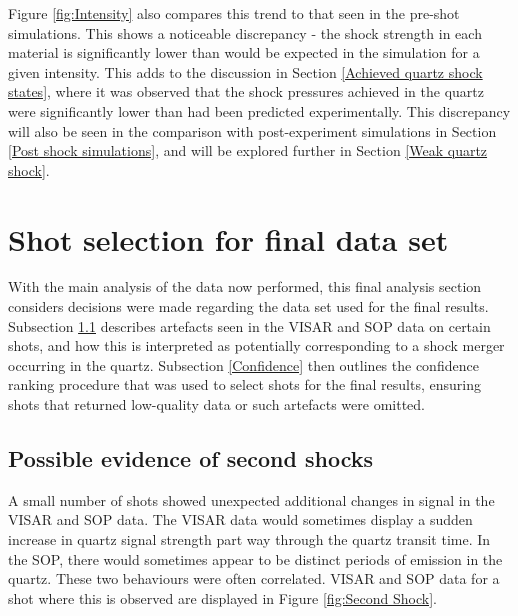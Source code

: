 Figure \ref{fig:Intensity} also compares this trend to that seen in the pre-shot simulations. This shows a noticeable discrepancy - the shock strength in each material is significantly lower than would be expected in the simulation for a given intensity. This adds to the discussion in Section \ref{Achieved quartz shock states}, where it was observed that the shock pressures achieved in the quartz were significantly lower than had been predicted experimentally. This discrepancy will also be seen in the comparison with post-experiment simulations in Section \ref{Post shock simulations}, and will be explored further in Section \ref{Weak quartz shock}.






\section{Shot selection for final data set} \label{Data choices}

With the main analysis of the data now performed, this final analysis section considers decisions were made regarding the data set used for the final results. Subsection \ref{Second shock} describes artefacts seen in the VISAR and SOP data on certain shots, and how this is interpreted as potentially corresponding to a shock merger occurring in the quartz. Subsection \ref{Confidence} then outlines the confidence ranking procedure that was used to select shots for the final results, ensuring shots that returned low-quality data or such artefacts were omitted. 

\subsection{Possible evidence of second shocks}\label{Second shock}

A small number of shots showed unexpected additional changes in signal in the VISAR and SOP data. The VISAR data would sometimes display a sudden increase in quartz signal strength part way through the quartz transit time. In the SOP, there would sometimes appear to be distinct periods of emission in the quartz. These two behaviours were often correlated. VISAR and SOP data for a shot where this is observed are displayed in Figure \ref{fig:Second Shock}.

